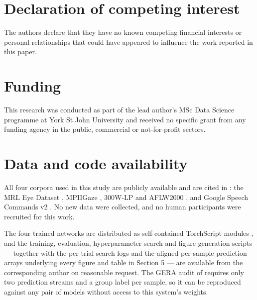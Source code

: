 \FloatBarrier

\section*{Declaration of competing interest}

The authors declare that they have no known competing financial interests or personal relationships that could have appeared to influence the work reported in this paper.

\FloatBarrier

\section*{Funding}

This research was conducted as part of the lead author's MSc Data Science programme at York St John University and received no specific grant from any funding agency in the public, commercial or not-for-profit sectors.

\FloatBarrier

\section*{Data and code availability}

All four corpora used in this study are publicly available and are cited in : the MRL Eye Dataset , MPIIGaze , 300W-LP and AFLW2000 , and Google Speech Commands v2 . No new data were collected, and no human participants were recruited for this work.

The four trained networks are distributed as self-contained TorchScript modules , and the training, evaluation, hyperparameter-search and figure-generation scripts --- together with the per-trial search logs and the aligned per-sample prediction arrays underlying every figure and table in Section 5 --- are available from the corresponding author on reasonable request. The GERA audit of  requires only two prediction streams and a group label per sample, so it can be reproduced against any pair of models without access to this system's weights.
